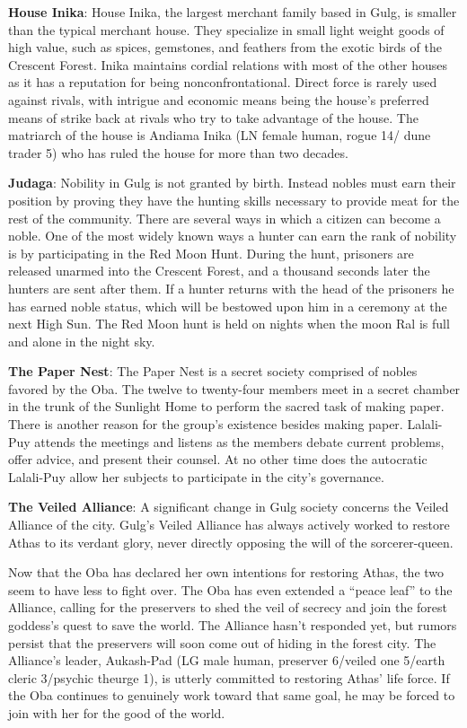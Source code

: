 {
	\textbf{House Inika}: House Inika, the largest merchant family based in Gulg, is smaller than the typical merchant house. They specialize in small light weight goods of high value, such as spices, gemstones, and feathers from the exotic birds of the Crescent Forest. Inika maintains cordial relations with most of the other houses as it has a reputation for being nonconfrontational. Direct force is rarely used against rivals, with intrigue and economic means being the house's preferred means of strike back at rivals who try to take advantage of the house. The matriarch of the house is Andiama Inika (LN female human, rogue 14/ dune trader 5) who has ruled the house for more than two decades.

	\textbf{Judaga}: Nobility in Gulg is not granted by birth. Instead nobles must earn their position by proving they have the hunting skills necessary to provide meat for the rest of the community. There are several ways in which a citizen can become a noble. One of the most widely known ways a hunter can earn the rank of nobility is by participating in the Red Moon Hunt. During the hunt, prisoners are released unarmed into the Crescent Forest, and a thousand seconds later the hunters are sent after them. If a hunter returns with the head of the prisoners he has earned noble status, which will be bestowed upon him in a ceremony at the next High Sun. The Red Moon hunt is held on nights when the moon Ral is full and alone in the night sky.

	\textbf{The Paper Nest}: The Paper Nest is a secret society comprised of nobles favored by the Oba. The twelve to twenty-four members meet in a secret chamber in the trunk of the Sunlight Home to perform the sacred task of making paper. There is another reason for the group's existence besides making paper. Lalali-Puy attends the meetings and listens as the members debate current problems, offer advice, and present their counsel. At no other time does the autocratic Lalali-Puy allow her subjects to participate in the city's governance.

	\textbf{The Veiled Alliance}: A significant change in Gulg society concerns the Veiled Alliance of the city. Gulg's Veiled Alliance has always actively worked to restore Athas to its verdant glory, never directly opposing the will of the sorcerer-queen.

	Now that the Oba has declared her own intentions for restoring Athas, the two seem to have less to fight over. The Oba has even extended a ``peace leaf'' to the Alliance, calling for the preservers to shed the veil of secrecy and join the forest goddess's quest to save the world. The Alliance hasn't responded yet, but rumors persist that the preservers will soon come out of hiding in the forest city. The Alliance's leader, Aukash-Pad (LG male human, preserver 6/veiled one 5/earth cleric 3/psychic theurge 1), is utterly committed to restoring Athas' life force. If the Oba continues to genuinely work toward that same goal, he may be forced to join with her for the good of the world.
}
